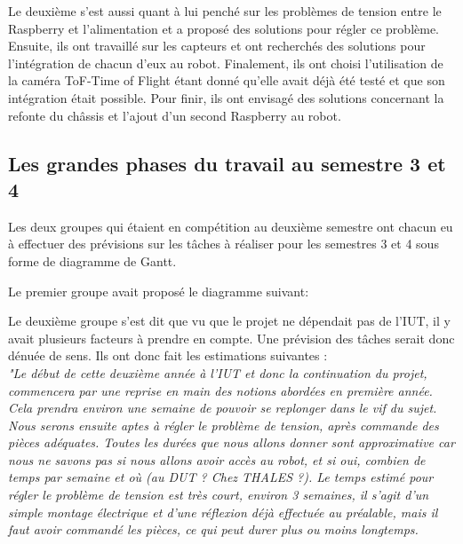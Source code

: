 \documentclass{PackagerQualityN}
\begin{document}
Le deuxième s’est aussi quant à lui penché sur les problèmes de tension entre le Raspberry et l’alimentation et a proposé des solutions pour régler ce problème. Ensuite, ils ont travaillé sur les capteurs et ont recherchés des solutions pour l’intégration de chacun d’eux au robot. Finalement, ils ont choisi l’utilisation de la caméra ToF-Time of Flight étant donné qu'elle avait déjà été testé et que son intégration était possible. Pour finir, ils ont envisagé des solutions concernant la refonte du châssis et l’ajout d’un second Raspberry au robot.

\subsection*{Les grandes phases du travail au semestre 3 et 4}
Les deux groupes qui étaient en compétition au deuxième semestre ont chacun eu à effectuer des prévisions sur les tâches à réaliser pour les semestres 3 et 4 sous forme de diagramme de Gantt.

Le premier groupe avait proposé le diagramme suivant:


Le deuxième groupe s’est dit que vu que le projet ne dépendait pas de l’IUT, il y avait plusieurs facteurs à prendre en compte. Une prévision des tâches serait donc dénuée de sens. Ils ont donc fait les estimations suivantes :\\

\textit{"Le début de cette deuxième année à l’IUT et donc la continuation du projet, commencera par une reprise en main des notions abordées en première année. Cela prendra environ une semaine de pouvoir se replonger dans le vif du sujet.}\\

\textit{Nous serons ensuite aptes à régler le problème de tension, après commande des pièces adéquates. Toutes les durées que nous allons donner sont approximative car nous ne savons pas si nous allons avoir accès au robot, et si oui, combien de temps par semaine et où (au DUT ? Chez THALES ?).
Le temps estimé pour régler le problème de tension est très court, environ 3 semaines, il s’agit d’un simple montage électrique et d’une réflexion déjà effectuée au préalable, mais il faut avoir commandé les pièces, ce qui peut durer plus ou moins longtemps.}\\
\end{document}
